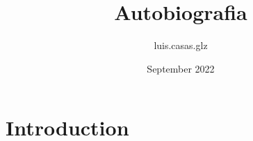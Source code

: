 \documentclass{article}
\title{Autobiografia}
\author{luis.casas.glz }
\date{September 2022}
\begin{document}
\maketitle

\section{Introduction}
\end{document}
